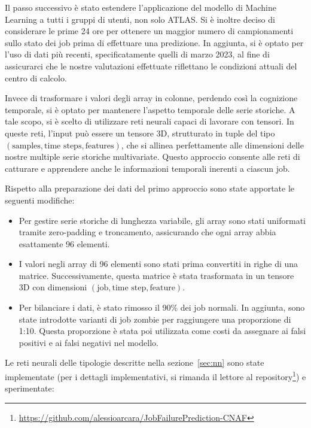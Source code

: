 Il passo successivo è stato estendere l'applicazione del modello di Machine
Learning a tutti i gruppi di utenti, non solo ATLAS. Si è inoltre deciso di
considerare le prime 24 ore per ottenere un maggior numero di campionamenti
sullo stato dei job prima di effettuare una predizione. In aggiunta, si è
optato per l'uso di dati più recenti, specificatamente quelli di marzo 2023,
al fine di assicurarci che le nostre valutazioni effettuate riflettano le
condizioni attuali del centro di calcolo.

Invece di trasformare i valori degli array in colonne, perdendo così la
cognizione temporale, si è optato per mantenere l'aspetto temporale delle
serie storiche. A tale scopo, si è scelto di utilizzare reti neurali capaci di
lavorare con tensori. In queste reti, l'input può essere un tensore 3D,
strutturato in tuple del tipo $(\text{samples},\text{time
steps},\text{features})$, che si allinea perfettamente alle dimensioni delle
nostre multiple serie storiche multivariate. Questo approccio consente alle
reti di catturare e apprendere anche le informazioni temporali inerenti a
ciascun job.

Rispetto alla preparazione dei dati del primo approccio sono state apportate
le seguenti modifiche:
\begin{itemize}
    \item Per gestire serie storiche di lunghezza variabile, gli array sono
        stati uniformati tramite zero-padding e troncamento, assicurando che
        ogni array abbia esattamente 96 elementi.
    \item I valori negli array di 96 elementi sono stati prima convertiti in
        righe di una matrice. Successivamente, questa matrice è stata
        trasformata in un tensore 3D con dimensioni $(\text{job},\text{time
        step},\text{feature})$.
    \item Per bilanciare i dati, è stato rimosso il 90\% dei job normali. In
        aggiunta, sono state introdotte varianti di job zombie per raggiungere
        una proporzione di 1:10. Questa proporzione è stata poi utilizzata
        come costi da assegnare ai falsi positivi e ai falsi negativi nel
        modello.
\end{itemize}

Le reti neurali delle tipologie descritte nella sezione~\ref{sec:nn} sono
state implementate (per i dettagli implementativi, si rimanda il lettore al
repository\footnote{\url{https://github.com/alessioarcara/JobFailurePrediction-CNAF}})
e sperimentate:

